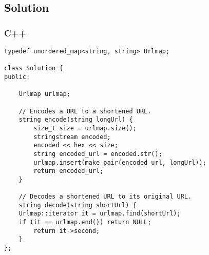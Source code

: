 \subsection*{Solution}
\subsubsection*{C++}
\begin{verbatim}
typedef unordered_map<string, string> Urlmap;

class Solution {
public:

    Urlmap urlmap;
    
    // Encodes a URL to a shortened URL.
    string encode(string longUrl) {
        size_t size = urlmap.size();
        stringstream encoded;
        encoded << hex << size;
        string encoded_url = encoded.str();
        urlmap.insert(make_pair(encoded_url, longUrl));
        return encoded_url;
    }
    
    // Decodes a shortened URL to its original URL.
    string decode(string shortUrl) {
    Urlmap::iterator it = urlmap.find(shortUrl);
    if (it == urlmap.end()) return NULL;
        return it->second;
    }
};
\end{verbatim}

\newpage
